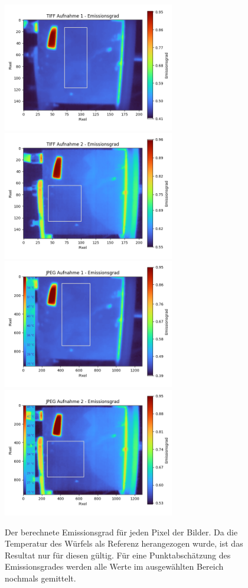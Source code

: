 \documentclass{article}
\begin{document}
\begin{figure}[H]
    \centering
    \captionsetup{width=14cm}
    \includegraphics[width=7.5cm]{img/eps_tiff_1.png}
    \includegraphics[width=7.5cm]{img/eps_tiff_2.png}
    \includegraphics[width=7.5cm]{img/eps_jpg_1.png}
    \includegraphics[width=7.5cm]{img/eps_jpg_2.png}
    \caption{
        Der berechnete Emissionsgrad für jeden Pixel der Bilder.
        Da die Temperatur des Würfels als Referenz herangezogen wurde, ist das Resultat nur für diesen gültig.
        Für eine Punktabschätzung des Emissionsgrades werden alle Werte im ausgewählten Bereich nochmals gemittelt.
    }
\end{figure}
\end{document}
